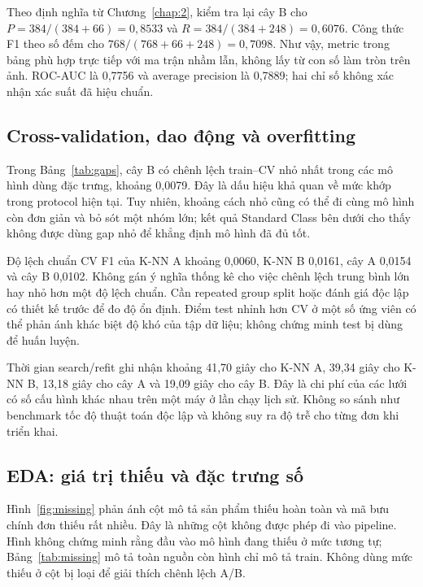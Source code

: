 \begin{samepage}
Theo định nghĩa từ Chương~\ref{chap:2}, kiểm tra lại cây B cho
$P=384/(384+66)=0{,}8533$ và $R=384/(384+248)=0{,}6076$.
Công thức F1 theo số đếm cho $768/(768+66+248)=0{,}7098$.
Như vậy, metric trong bảng phù hợp trực tiếp với ma trận nhầm lẫn, không
lấy từ con số làm tròn trên ảnh. ROC-AUC là 0,7756 và average precision
là 0,7889; hai chỉ số không xác nhận xác suất đã hiệu chuẩn.
\par\end{samepage}

\subsection{Cross-validation, dao động và overfitting}

Trong Bảng~\ref{tab:gaps}, cây B có chênh lệch train--CV nhỏ nhất trong các
mô hình dùng đặc trưng, khoảng 0,0079. Đây là dấu hiệu khả quan về mức
khớp trong protocol hiện tại. Tuy nhiên, khoảng cách nhỏ cũng có thể đi
cùng mô hình còn đơn giản và bỏ sót một nhóm lớn; kết quả Standard Class
bên dưới cho thấy không được dùng gap nhỏ để khẳng định mô hình đã đủ tốt.

Độ lệch chuẩn CV F1 của K-NN A khoảng 0,0060, K-NN B 0,0161, cây A
0,0154 và cây B 0,0102. Không gán ý nghĩa thống kê cho việc chênh lệch
trung bình lớn hay nhỏ hơn một độ lệch chuẩn. Cần repeated group split
hoặc đánh giá độc lập có thiết kế trước để đo độ ổn định. Điểm test nhỉnh
hơn CV ở một số ứng viên có thể phản ánh khác biệt độ khó của tập dữ liệu;
không chứng minh test bị dùng để huấn luyện.

Thời gian search/refit ghi nhận khoảng 41,70 giây cho K-NN A, 39,34 giây
cho K-NN B, 13,18 giây cho cây A và 19,09 giây cho cây B. Đây là chi phí
của các lưới có số cấu hình khác nhau trên một máy ở lần chạy lịch sử.
Không so sánh như benchmark tốc độ thuật toán độc lập và không suy ra
độ trễ cho từng đơn khi triển khai.

\subsection{EDA: giá trị thiếu và đặc trưng số}
Hình~\ref{fig:missing} phản ánh cột mô tả sản phẩm thiếu hoàn toàn và mã
bưu chính đơn thiếu rất nhiều. Đây là những cột không được phép đi vào
pipeline. Hình không chứng minh rằng đầu vào mô hình đang thiếu ở mức
tương tự; Bảng~\ref{tab:missing} mô tả toàn nguồn còn hình chỉ mô tả train.
Không dùng mức thiếu ở cột bị loại để giải thích chênh lệch A/B.


